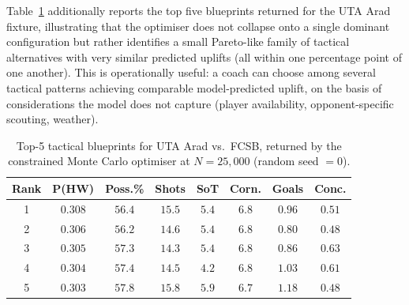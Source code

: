 \begin{table}[!htbp]
\centering
\caption{Best (rank 1) tactical blueprints produced by the constrained Monte Carlo optimiser at $N = 25{,}000$ for two example fixtures from the 2024--2025 holdout season, with the calibrated CatBoost model as the underlying classifier. Optimised probabilities are the mean across five random seeds. ``Goals'' and ``Conceded'' are rolling five-match averages.}
\label{tab:tactical_blueprint}
\end{table}

Table~\ref{tab:top_blueprints} additionally reports the top five blueprints returned for the UTA Arad fixture, illustrating that the optimiser does not collapse onto a single dominant configuration but rather identifies a small Pareto-like family of tactical alternatives with very similar predicted uplifts (all within one percentage point of one another). This is operationally useful: a coach can choose among several tactical patterns achieving comparable model-predicted uplift, on the basis of considerations the model does not capture (player availability, opponent-specific scouting, weather).

\begin{table}[htbp]
\centering
\caption{Top-5 tactical blueprints for UTA Arad vs.\ FCSB, returned by the constrained Monte Carlo optimiser at $N = 25{,}000$ (random seed $= 0$).}
\label{tab:top_blueprints}
\begin{tabular}{|c|c|c|c|c|c|c|c|}
\hline
\textbf{Rank} & \textbf{P(HW)} & \textbf{Poss.\%} & \textbf{Shots} & \textbf{SoT} & \textbf{Corn.} & \textbf{Goals} & \textbf{Conc.} \\
\hline
1 & $0.308$ & $56.4$ & $15.5$ & $5.4$ & $6.8$ & $0.96$ & $0.51$ \\
2 & $0.306$ & $56.2$ & $14.6$ & $5.4$ & $6.8$ & $0.80$ & $0.48$ \\
3 & $0.305$ & $57.3$ & $14.3$ & $5.4$ & $6.8$ & $0.86$ & $0.63$ \\
4 & $0.304$ & $57.4$ & $14.5$ & $4.2$ & $6.8$ & $1.03$ & $0.61$ \\
5 & $0.303$ & $57.8$ & $15.8$ & $5.9$ & $6.7$ & $1.18$ & $0.48$ \\
\hline
\end{tabular}
\end{table}

